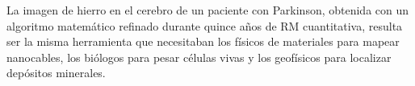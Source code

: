 \documentclass[12pt, a4paper]{article}
\begin{document}
La imagen de hierro en el cerebro de un paciente con Parkinson, obtenida con un algoritmo matemático refinado durante quince años de RM cuantitativa, resulta ser la misma herramienta que necesitaban los físicos de materiales para mapear nanocables, los biólogos para pesar células vivas y los geofísicos para localizar depósitos minerales.

\printbibliography[heading=bibintoc, title={Referencias}]
\end{document}
